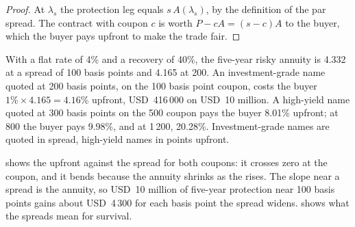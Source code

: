 \begin{proof}
At $\lambda_s$ the protection leg equals $s\,A(\lambda_s)$, by the definition of the
par spread. The contract with coupon $c$ is worth $P - cA = (s - c)A$ to the buyer,
which the buyer pays upfront to make the trade fair.
\end{proof}

\begin{example}\label{ex:m2:credit-default-swaps:upfront}
With a flat rate of 4\% and a recovery of 40\%, the five-year risky annuity is 4.332
at a spread of 100 basis points and 4.165 at 200. An investment-grade name quoted at
200 basis points, on the 100 basis point coupon, costs the buyer $1\% \times 4.165 =
4.16\%$ upfront, USD~416\,000 on USD~10 million. A high-yield name quoted at 300
basis points on the 500 coupon pays the buyer 8.01\% upfront; at 800 the buyer pays
9.98\%, and at 1\,200, 20.28\%. Investment-grade names are quoted in spread,
high-yield names in points upfront.
\end{example}

 shows the upfront against the spread for
both coupons: it crosses zero at the coupon, and it bends because the annuity shrinks
as the  rises. The slope near a spread is the annuity, so USD~10 million
of five-year protection near 100 basis points gains about USD~4\,300 for each basis
point the spread widens.  shows what the
spreads mean for survival.

